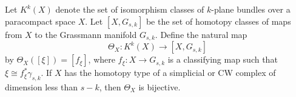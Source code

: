 Let $K^k(X)$ denote the set of isomorphism classes of $k$-plane bundles over a paracompact space $X$. Let $[X, G_{s,k}]$ be the set of homotopy classes of maps from $X$ to the Grassmann manifold $G_{s,k}$. Define the natural map
$$\Theta_X: K^k(X) \to [X, G_{s,k}]$$
by $\Theta_X([\xi]) = [f_\xi]$, where $f_\xi: X \to G_{s,k}$ is a classifying map such that $\xi \cong f_\xi^* \gamma_{s,k}$. If $X$ has the homotopy type of a simplicial or CW complex of dimension less than $s - k$, then $\Theta_X$ is bijective.
